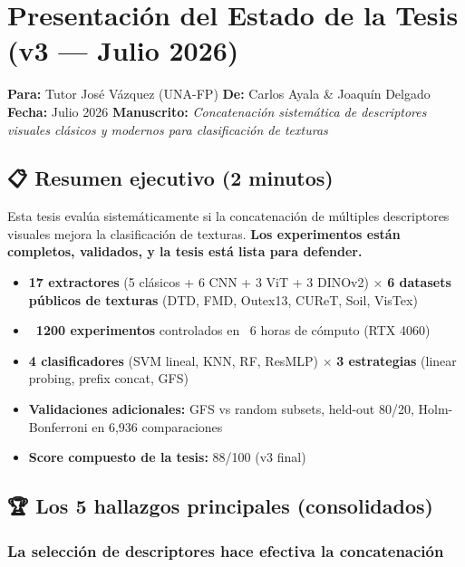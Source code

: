 \section{Presentación del Estado de la Tesis (v3 — Julio 2026)}

\textbf{Para:} Tutor José Vázquez (UNA-FP)
\textbf{De:} Carlos Ayala \& Joaquín Delgado
\textbf{Fecha:} Julio 2026
\textbf{Manuscrito:} \textit{Concatenación sistemática de descriptores visuales clásicos y modernos para clasificación de texturas}

\hrulefill

\subsection{📋 Resumen ejecutivo (2 minutos)}

Esta tesis evalúa sistemáticamente si la concatenación de múltiples descriptores visuales mejora la clasificación de texturas. \textbf{Los experimentos están completos, validados, y la tesis está lista para defender.}

\begin{itemize}
  \item \textbf{17 extractores} (5 clásicos + 6 CNN + 3 ViT + 3 DINOv2) $\times$ \textbf{6 datasets públicos de texturas} (DTD, FMD, Outex13, CUReT, Soil, VisTex)
  \item \textbf{~1200 experimentos} controlados en ~6 horas de cómputo (RTX 4060)
  \item \textbf{4 clasificadores} (SVM lineal, KNN, RF, ResMLP) $\times$ \textbf{3 estrategias} (linear probing, prefix concat, GFS)
  \item \textbf{Validaciones adicionales:} GFS vs random subsets, held-out 80/20, Holm-Bonferroni en 6,936 comparaciones
  \item \textbf{Score compuesto de la tesis:} 88/100 (v3 final)
\end{itemize}

\hrulefill

\subsection{🏆 Los 5 hallazgos principales (consolidados)}

\subsubsection{La selección de descriptores hace efectiva la concatenación}

